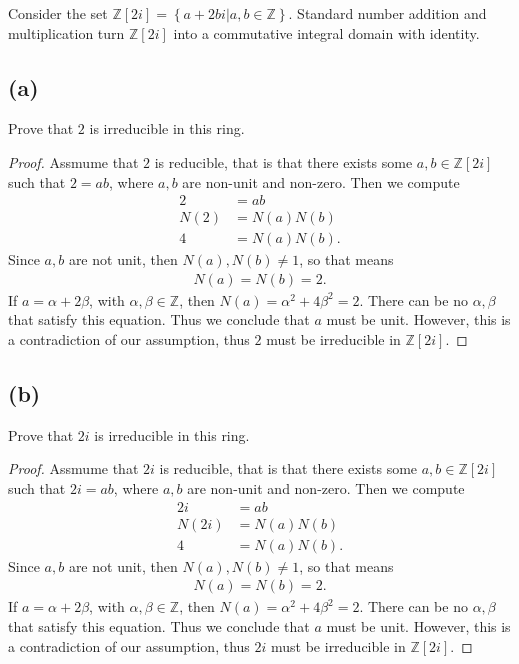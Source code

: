 \documentclass[10pt]{armath}
\newcommand{\Z}{\mathbb{Z}}
\newcommand{\zi}{\mathbb{Z}\left[2i\right]}
\begin{document}
Consider the set $\zi = \left\{a+2bi\vert a,b\in\Z\right\}$. Standard number
addition and multiplication turn $\zi$ into a commutative integral domain with
identity.

\subsection*{(a)}%
\label{sub:_a_}

Prove that $2$ is irreducible in this ring.

\begin{proof}
   Assmume that $2$ is reducible, that is that there exists some $a,b\in\zi$
   such that $2=ab$, where $a,b$ are non-unit and non-zero. Then we compute
   \begin{align*}
     2&=ab\\
     N(2)&=N(a)N(b)\\
     4&=N(a)N(b).
   \end{align*}
   Since $a,b$ are not unit, then $N(a),N(b)\neq 1$, so that means
   \begin{align*}
     N(a)=N(b)=2.
   \end{align*}
   If $a=\alpha+2\beta$, with $\alpha,\beta\in\Z$, then
   $N(a)=\alpha^2+4\beta^2=2$. There can be no $\alpha,\beta$ that satisfy this
   equation. Thus we conclude that $a$ must be unit. However, this is a
   contradiction of our assumption, thus $2$ must be irreducible in $\zi$.
\end{proof}

\subsection*{(b)}%
\label{sub:_b_}

Prove that $2i$ is irreducible in this ring.

\begin{proof}
   Assmume that $2i$ is reducible, that is that there exists some $a,b\in\zi$
   such that $2i=ab$, where $a,b$ are non-unit and non-zero. Then we compute
   \begin{align*}
     2i&=ab\\
     N(2i)&=N(a)N(b)\\
     4&=N(a)N(b).
   \end{align*}
   Since $a,b$ are not unit, then $N(a),N(b)\neq 1$, so that means
   \begin{align*}
     N(a)=N(b)=2.
   \end{align*}
   If $a=\alpha+2\beta$, with $\alpha,\beta\in\Z$, then
   $N(a)=\alpha^2+4\beta^2=2$. There can be no $\alpha,\beta$ that satisfy this
   equation. Thus we conclude that $a$ must be unit. However, this is a
   contradiction of our assumption, thus $2i$ must be irreducible in $\zi$.
\end{proof}
\end{document}
